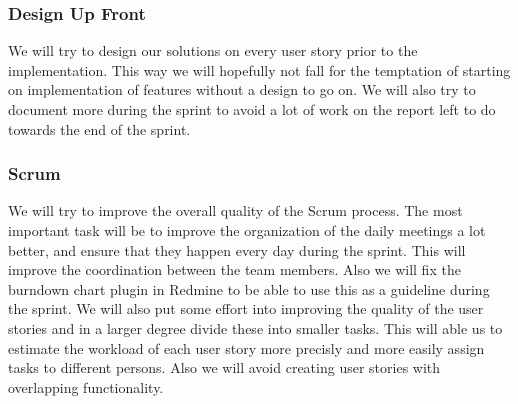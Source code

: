 \subsubsection{Design Up Front}
We will try to design our solutions on every user story prior to the implementation. This way we will hopefully not fall for the temptation of starting on implementation of features without a design to go on. We will also try to document more during the sprint to avoid a lot of work on the report left to do towards the end of the sprint.

\subsubsection{Scrum}
We will try to improve the overall quality of the Scrum process. The most important task will be to improve the organization of the daily meetings a lot better, and ensure that they happen every day during the sprint. This will improve the coordination between the team members. Also we will fix the burndown chart plugin in Redmine to be able to use this as a guideline during the sprint. We will also put some effort into improving the quality of the user stories and in a larger degree divide these into smaller tasks. This will able us to estimate the workload of each user story more precisly and more easily assign tasks to different persons. Also we will avoid creating user stories with overlapping functionality.
